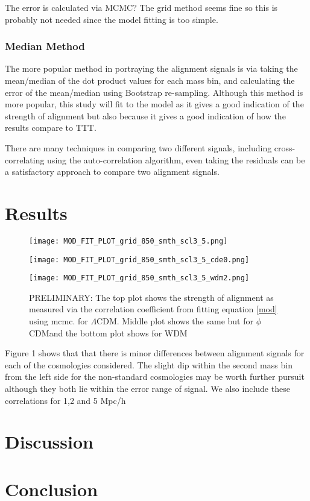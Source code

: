\documentclass[a4paper,fleqn,usenatbib]{mnras}
\def \qcdm{$\phi$CDM}
\begin{document}
The error is calculated via MCMC? The grid method seems fine so this is probably not needed since the model fitting is too simple.
\subsubsection{Median Method}
The more popular method in portraying the alignment signals is via taking the mean/median of the dot product values for each mass bin, and calculating the error of the mean/median using Bootstrap re-sampling. Although this method is more popular, this study will fit to the model as it gives a good indication of the strength of alignment but also because it gives a good indication of how the results compare to TTT.

There are many techniques in comparing two different signals, including cross-correlating using the auto-correlation algorithm, even taking the residuals can be a satisfactory approach to compare two alignment signals.

\section{Results}\label{SiriusBlack}
 
\begin{figure}
\centering
\texttt{[image: MOD\_FIT\_PLOT\_grid\_850\_smth\_scl3\_5.png]}
\label{cor_fig} 
\end{figure}
\begin{figure}
\centering
\texttt{[image: MOD\_FIT\_PLOT\_grid\_850\_smth\_scl3\_5\_cde0.png]}\label{cor_fig_cde0} 

\end{figure}
\begin{figure}
\centering
\texttt{[image: MOD\_FIT\_PLOT\_grid\_850\_smth\_scl3\_5\_wdm2.png]}\label{cor_fig_wdm2} 
\caption{PRELIMINARY: The top plot shows the strength of alignment as measured via the correlation coefficient from fitting equation \ref{mod} using mcmc. for $\Lambda$CDM. Middle plot shows the same but for \qcdm and the bottom plot shows for WDM}
\end{figure}
Figure 1 shows that that there is minor differences between alignment signals for each of the cosmologies considered. The slight dip within the second mass bin from the left side for the non-standard cosmologies may be worth further pursuit although they both lie within the error range of \citet{Trowland_13} signal. We also include these correlations for 1,2 and 5 Mpc/h

\section{Discussion}\label{Discussion}

\section{Conclusion}\label{Conclusion}


 

\bsp	%
\label{lastpage}
\end{document}

